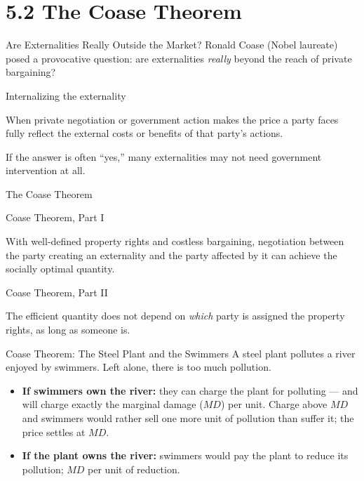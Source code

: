 \documentclass[11pt,aspectratio=169]{beamer}
\begin{document}
\section{5.2 The Coase Theorem}

\begin{frame}{Are Externalities Really Outside the Market?}
  Ronald Coase (Nobel laureate) posed a provocative question: are externalities \emph{really} beyond the reach of private bargaining?
  \begin{block}{Internalizing the externality}
    \end{block}
    When private negotiation or government action makes the price a party faces fully reflect the external costs or benefits of that party's actions.

  If the answer is often ``yes,'' many externalities may not need government intervention at all.
\end{frame}

\begin{frame}{The Coase Theorem}
	  \begin{block}
 {Coase Theorem, Part I}
  \end{block}
    With well-defined property rights and costless bargaining, negotiation between the party creating an externality and the party affected by it can achieve the socially optimal quantity.

  
  \begin{block}{Coase Theorem, Part II}
  	  \end{block}
    The efficient quantity does not depend on \emph{which} party is assigned the property rights, as long as someone is. 

\end{frame}

\begin{frame}{Coase Theorem: The Steel Plant and the Swimmers}
  A steel plant pollutes a river enjoyed by swimmers. Left alone, there is too much pollution.
  \begin{itemize}
    \item \textbf{If swimmers own the river:} they can charge the plant for polluting --- and will charge exactly the marginal damage (\(MD\)) per unit. Charge above \(MD\) and swimmers would rather sell one more unit of pollution than suffer it; the price settles at \(MD\).
    \item \textbf{If the plant owns the river:}  swimmers would pay the plant to reduce its pollution;  \(MD\) per unit of reduction.
  \end{itemize}


\end{frame}
\end{document}
